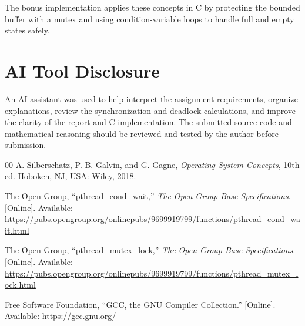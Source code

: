 \documentclass[conference]{IEEEtran}
\begin{document}
The bonus implementation applies these concepts in C by protecting the bounded buffer with a mutex and using condition-variable loops to handle full and empty states safely.

\section*{AI Tool Disclosure}
An AI assistant was used to help interpret the assignment requirements, organize explanations, review the synchronization and deadlock calculations, and improve the clarity of the report and C implementation. The submitted source code and mathematical reasoning should be reviewed and tested by the author before submission.

\begin{thebibliography}{00}
A. Silberschatz, P. B. Galvin, and G. Gagne, \textit{Operating System Concepts}, 10th ed. Hoboken, NJ, USA: Wiley, 2018.

The Open Group, ``pthread\_cond\_wait,'' \textit{The Open Group Base Specifications}. [Online]. Available: \url{https://pubs.opengroup.org/onlinepubs/9699919799/functions/pthread_cond_wait.html}

The Open Group, ``pthread\_mutex\_lock,'' \textit{The Open Group Base Specifications}. [Online]. Available: \url{https://pubs.opengroup.org/onlinepubs/9699919799/functions/pthread_mutex_lock.html}

Free Software Foundation, ``GCC, the GNU Compiler Collection.'' [Online]. Available: \url{https://gcc.gnu.org/}
\end{thebibliography}
\end{document}
